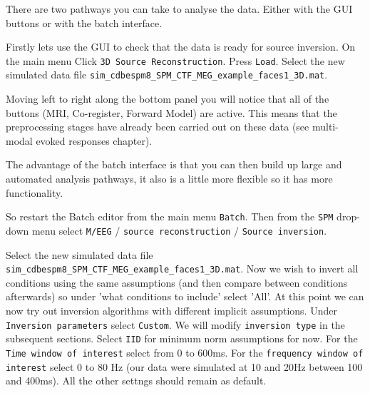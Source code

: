 There are two pathways you can take to analyse the data. Either with the GUI buttons or with the batch interface. 

Firstly lets use the GUI to check that the data is ready for source inversion. On the main menu Click \texttt{3D Source Reconstruction}. Press \texttt{Load}. Select the new simulated data file \texttt{sim\_cdbespm8_SPM_CTF_MEG_example_faces1_3D.mat}.

Moving left to right along the bottom panel you will notice that all of the buttons (MRI, Co-register, Forward Model) are active. This means that the preprocessing stages have already been carried out on these data (see multi-modal evoked responses chapter).

 The advantage of the batch interface is that you can then build up large and automated analysis pathways, it also is a little more flexible so it has more functionality.

So restart the Batch editor from the main menu \texttt{Batch}. Then from the \texttt{SPM} drop-down menu select \texttt{M/EEG} / \texttt{source reconstruction} / \texttt{Source inversion}.

Select the new simulated data file \texttt{sim\_cdbespm8_SPM_CTF_MEG_example_faces1_3D.mat}.
Now we wish to invert all conditions using the same assumptions (and then compare between conditions afterwards) so under 'what conditions to include' select 'All'.
At this point we can now try out inversion algorithms with different implicit assumptions. Under \texttt{Inversion parameters} select \texttt{Custom}.
We will modify \texttt{inversion type} in the subsequent sections. Select \texttt{IID} for minimum norm assumptions for now.
For the \texttt{Time window of interest} select from 0 to 600ms. For the \texttt{frequency window of interest} select 0 to 80 Hz  (our data were simulated at 10 and 20Hz between 100 and 400ms).
All the other settngs should remain as default.

